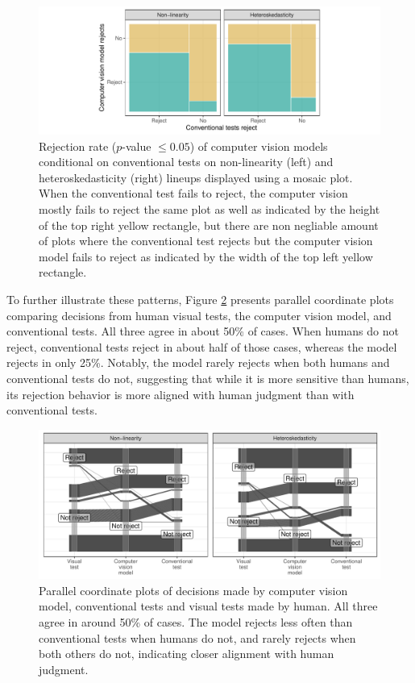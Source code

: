 \documentclass[]{interact}
\theoremstyle{plain}%
\theoremstyle{definition}
\theoremstyle{remark}
\begin{document}
\begin{figure}[!h]

{\centering \includegraphics[width=1\linewidth]{paper_files/figure-latex/conv-mosaic-1} 

}

\caption{Rejection rate ($p$-value $\leq0.05$) of computer vision models conditional on conventional tests on non-linearity (left) and heteroskedasticity (right) lineups displayed using a mosaic plot. When the conventional test fails to reject, the computer vision mostly fails to reject the same plot as well as indicated by the height of the top right yellow rectangle, but there are non negliable amount of plots where the conventional test rejects but the computer vision model fails to reject as indicated by the width of the top left yellow rectangle.}\label{fig:conv-mosaic}
\end{figure}

To further illustrate these patterns, Figure \ref{fig:pcp} presents
parallel coordinate plots comparing decisions from human visual tests,
the computer vision model, and conventional tests. All three agree in
about 50\% of cases. When humans do not reject, conventional tests
reject in about half of those cases, whereas the model rejects in only
25\%. Notably, the model rarely rejects when both humans and
conventional tests do not, suggesting that while it is more sensitive
than humans, its rejection behavior is more aligned with human judgment
than with conventional tests.

\begin{figure}[!h]

{\centering \includegraphics[width=1\linewidth]{paper_files/figure-latex/pcp-1} 

}

\caption{Parallel coordinate plots of decisions made by computer vision model, conventional tests and visual tests made by human. All three agree in around 50\% of cases. The model rejects less often than conventional tests when humans do not, and rarely rejects when both others do not, indicating closer alignment with human judgment.}\label{fig:pcp}
\end{figure}
\end{document}
